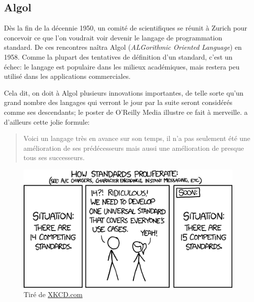 \subsection{Algol}
\label{sec:informatique:historique:algol}

Dès la fin de la décennie 1950, un comité de scientifiques se réunit à
Zurich pour concevoir ce que l'on voudrait voir devenir le langage de
programmation standard. De ces rencontres naîtra Algol
(\emph{ALGorithmic Oriented Language}) en 1958. Comme la plupart des
tentatives de définition d'un standard, c'est un échec: le langage est
populaire dans les milieux académiques, mais restera peu utilisé dans
les applications commerciales.

Cela dit, on doit à Algol plusieurs innovations importantes, de telle
sorte qu'un grand nombre des langages qui verront le jour par la suite
seront considérés comme ses descendants; le poster
 de O'Reilly Media illustre ce fait à
merveille. \citet{Hoare:1973} a d'ailleurs cette jolie formule:
\begin{quote}
  Voici un langage très en avance sur son temps, il n'a pas seulement
  été une amélioration de ses prédécesseurs mais aussi une
  amélioration de presque tous ses successeurs.
\end{quote}


\begin{figure}[t]
  \centering
  \begin{minipage}{0.9\linewidth}
    \includegraphics{standards} \\
    \footnotesize\sffamily%
    Tiré de \href{http://xkcd.com/927/}{XKCD.com}
  \end{minipage}
\end{figure}

